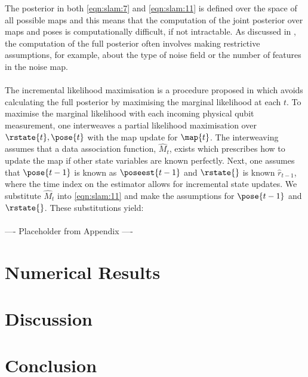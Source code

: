 The posterior in both \cref{eqn:slam:7} and \cref{eqn:slam:11} is defined over the space of all possible maps and this means that the computation of the joint posterior over maps and poses is computationally difficult,  if not intractable. As discussed in \cite{thrun2001probabilistic}, the computation of the full posterior often involves making restrictive assumptions, for example, about the type of noise field or the number of features in the noise map. \\
\\
The incremental likelihood maximisation is a procedure proposed in \cite{thrun2001probabilistic} which avoids calculating the full posterior by maximising the marginal likelihood at each $t$. To maximise the marginal likelihood with each incoming physical qubit measurement,  one interweaves a partial likelihood maximisation over $\rstate{t}, \pose{t}$ with the map update for $\map{t}$. The interweaving assumes that a data association function, $\hat{M}_t$, exists which prescribes how to update the map if other state variables are known perfectly. Next, one assumes that $\pose{t-1}$ is known as $\poseest{t-1}$ and $\rstate{}$ is known $\hat{r}_{t-1}$, where the time index on the estimator allows for incremental state updates. We substitute $\hat{M}_t$ into \cref{eqn:slam:11} and make the assumptions for $\pose{t-1}$  and $\rstate{}$. These substitutions yield: \\
\\
---- Placeholder from Appendix ----


\section{Numerical Results} \label{sec:ohfuckresults}


\section{Discussion} \label{sec:discussion}


\section{Conclusion} \label{sec:conclusion}
































